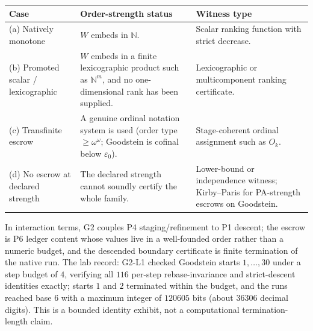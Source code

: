 \documentclass[11pt]{article}
\theoremstyle{definition}
\begin{document}
\begin{center}
\footnotesize
\begin{tabularx}{\textwidth}{@{}lXX@{}}
\toprule
Case & Order-strength status & Witness type \\
\midrule
(a) Natively monotone & $W$ embeds in $\mathbb{N}$. & Scalar ranking function with strict
decrease. \\
(b) Promoted scalar / lexicographic & $W$ embeds in a finite lexicographic product such as
$\mathbb{N}^m$, and no one-dimensional rank has been supplied. & Lexicographic or multicomponent
ranking certificate. \\
(c) Transfinite escrow & A genuine ordinal notation system is used (order type $\ge \omega^\omega$;
Goodstein is cofinal below $\varepsilon_0$). & Stage-coherent ordinal assignment such as $O_k$. \\
(d) No escrow at declared strength & The declared strength cannot soundly certify the whole family. &
Lower-bound or independence witness; Kirby--Paris for PA-strength escrows on Goodstein. \\
\bottomrule
\end{tabularx}
\end{center}

In interaction terms, G2 couples P4 staging/refinement to P1 descent; the escrow is P6 ledger content
whose values live in a well-founded order rather than a numeric budget, and the descended boundary
certificate is finite termination of the native run. The lab record: G2-L1 checked Goodstein starts
$1, \ldots, 30$ under a step budget of $4$, verifying all $116$ per-step rebase-invariance and
strict-descent identities exactly; starts $1$ and $2$ terminated within the budget, and the runs
reached base $6$ with a maximum integer of $120605$ bits (about $36306$ decimal digits). This is a
bounded identity exhibit, not a computational termination-length claim.
\end{document}
